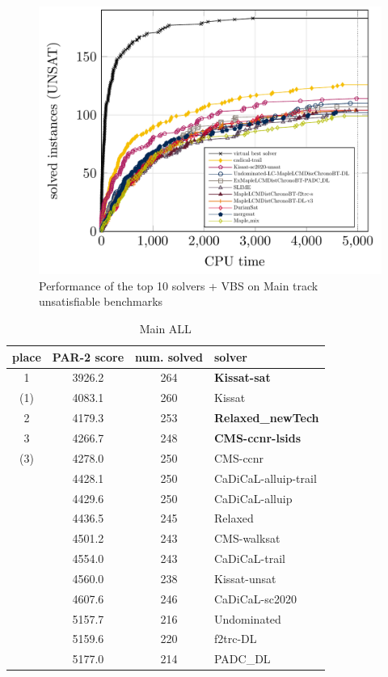 \documentclass{elsarticle}
\begin{document}
\begin{figure}
\centering
\includegraphics[width=.9\textwidth]{img/paper-main-top10-UNSAT.pdf}
\caption{Performance of the top 10 solvers + VBS on Main track unsatisfiable benchmarks}
\end{figure}

\begin{table}
\caption{Main ALL}
\label{tab:mainALL}
\begin{tabular}{cccl}
place & PAR-2 score & num. solved & solver \\
\hline
1     & 3926.2 & 264 & {\bf Kissat-sat} \\
(1)   & 4083.1 & 260 & Kissat \\
2     & 4179.3 & 253 & {\bf Relaxed\_newTech} \\
3     & 4266.7 & 248 & {\bf CMS-ccnr-lsids} \\
(3)   & 4278.0 & 250 & CMS-ccnr \\
      & 4428.1 & 250 & CaDiCaL-alluip-trail \\
      & 4429.6 & 250 & CaDiCaL-alluip \\
      & 4436.5 & 245 & Relaxed \\
      & 4501.2 & 243 & CMS-walksat \\
      & 4554.0 & 243 & CaDiCaL-trail \\
      & 4560.0 & 238 & Kissat-unsat \\
      & 4607.6 & 246 & CaDiCaL-sc2020 \\
      & 5157.7 & 216 & Undominated \\
      & 5159.6 & 220 & f2trc-DL \\
      & 5177.0 & 214 & PADC\_DL \\   
\end{tabular}
\end{table}
\end{document}
